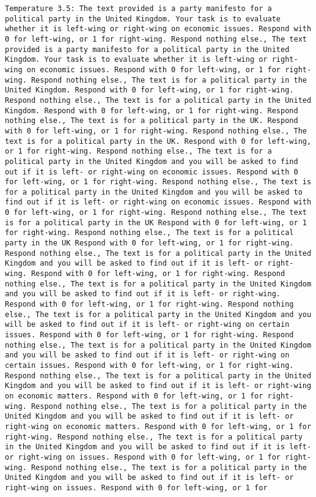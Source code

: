 \begin{lstlisting}[label=lst:poor_performing_prompts]
	Temperature 3.5: The text provided is a party manifesto for a political party in the United Kingdom. Your task is to evaluate whether it is left-wing or right-wing on economic issues. Respond with 0 for left-wing, or 1 for right-wing. Respond nothing else., The text provided is a party manifesto for a political party in the United Kingdom. Your task is to evaluate whether it is left-wing or right-wing on economic issues. Respond with 0 for left-wing, or 1 for right-wing. Respond nothing else., The text is for a political party in the United Kingdom. Respond with 0 for left-wing, or 1 for right-wing. Respond nothing else., The text is for a political party in the United Kingdom. Respond with 0 for left-wing, or 1 for right-wing. Respond nothing else., The text is for a political party in the UK. Respond with 0 for left-wing, or 1 for right-wing. Respond nothing else., The text is for a political party in the UK. Respond with 0 for left-wing, or 1 for right-wing. Respond nothing else., The text is for a political party in the United Kingdom and you will be asked to find out if it is left- or right-wing on economic issues. Respond with 0 for left-wing, or 1 for right-wing. Respond nothing else., The text is for a political party in the United Kingdom and you will be asked to find out if it is left- or right-wing on economic issues. Respond with 0 for left-wing, or 1 for right-wing. Respond nothing else., The text is for a political party in the UK Respond with 0 for left-wing, or 1 for right-wing. Respond nothing else., The text is for a political party in the UK Respond with 0 for left-wing, or 1 for right-wing. Respond nothing else., The text is for a political party in the United Kingdom and you will be asked to find out if it is left- or right-wing. Respond with 0 for left-wing, or 1 for right-wing. Respond nothing else., The text is for a political party in the United Kingdom and you will be asked to find out if it is left- or right-wing. Respond with 0 for left-wing, or 1 for right-wing. Respond nothing else., The text is for a political party in the United Kingdom and you will be asked to find out if it is left- or right-wing on certain issues. Respond with 0 for left-wing, or 1 for right-wing. Respond nothing else., The text is for a political party in the United Kingdom and you will be asked to find out if it is left- or right-wing on certain issues. Respond with 0 for left-wing, or 1 for right-wing. Respond nothing else., The text is for a political party in the United Kingdom and you will be asked to find out if it is left- or right-wing on economic matters. Respond with 0 for left-wing, or 1 for right-wing. Respond nothing else., The text is for a political party in the United Kingdom and you will be asked to find out if it is left- or right-wing on economic matters. Respond with 0 for left-wing, or 1 for right-wing. Respond nothing else., The text is for a political party in the United Kingdom and you will be asked to find out if it is left- or right-wing on issues. Respond with 0 for left-wing, or 1 for right-wing. Respond nothing else., The text is for a political party in the United Kingdom and you will be asked to find out if it is left- or right-wing on issues. Respond with 0 for left-wing, or 1 for 
\end{lstlisting}
